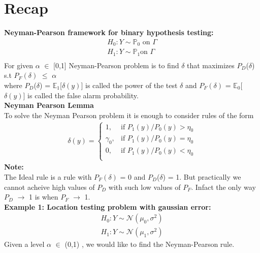\documentclass[12pt]{report}
\begin{document}
\maketitle
\section{Recap}
{\bf Neyman-Pearson framework for binary hypothesis testing: }
\begin{align*}
H_0 : Y \sim \mathbb{P}_0  \text{ on   } \Gamma \\ 
H_1 : Y \sim \mathbb{P}_1   \text{on   } \Gamma \\[-10pt]
\end{align*}
For given $\alpha$ $\in$ [0,1] Neyman-Pearson problem is to find $\delta$ that maximizes 
$P_D$($\delta$) s.t $P_F(\delta)$ $\leq$ $\alpha$\\
where $P_D$($\delta$) = $\mathbb{E}_1$[$\delta(y)$] is called the power of the test $\delta$ and 
$P_F(\delta)$ = $\mathbb{E}_0$[$\delta(y)$] is called the false alarm probability.\\[15pt]
{\bf Neyman Pearson Lemma}\\
To solve the Neyman Pearson problem it is enough to consider rules of the form
\begin{align*}
 \delta(y) = \left\{ \begin{array}{cc}
1, &  \text{if }P_1(y)/P_0(y)>\eta_0 \\
\gamma_0, & \text{if }P_1(y)/P_0(y)=\eta_0\\
0, &  \text{if }P_1(y)/P_0(y) < \eta_0 \\
\end{array}\right. 
\end{align*}
{\bf Note:}\\
The Ideal rule is a rule with $P_F(\delta)$ = 0 and $P_D$($\delta$) = 1. But practically we cannot acheive high values of $P_D$
with such low values of $P_F$. Infact the only way $P_D$ $\to$ 1 is when $P_F$ $\to$ 1.\\[12pt]
{\bf Example 1: Location testing problem with gaussian error:}\\[-10pt]
\begin{align*}
H_0 : Y  \sim  \mathcal{N}(\mu_0,\sigma^2)\\
H_1 : Y  \sim  \mathcal{N}(\mu_1,\sigma^2)
\end{align*}
Given a level $\alpha $ $ \in $ (0,1) , we would like to find the Neyman-Pearson rule.\\
\end{document}
